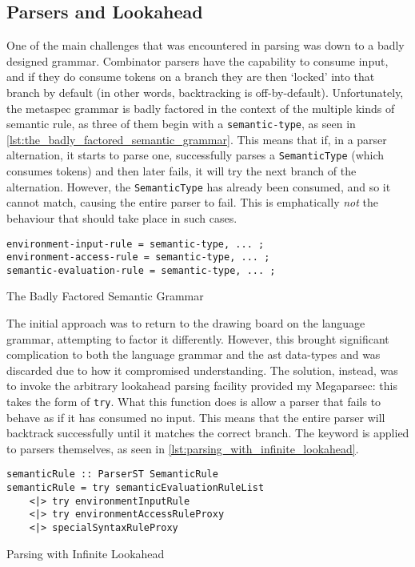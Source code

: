 \subsection{Parsers and Lookahead} %
\label{sub:parsers_and_lookahead}
One of the main challenges that was encountered in parsing was down to a badly designed grammar. 
Combinator parsers have the capability to consume input, and if they do consume tokens on a branch they are then `locked' into that branch by default (in other words, backtracking is off-by-default).
Unfortunately, the \gls{metaspec} grammar is badly factored in the context of the multiple kinds of semantic rule, as three of them begin with a \texttt{semantic-type}, as seen in \autoref{lst:the_badly_factored_semantic_grammar}.
This means that if, in a parser alternation, it starts to parse one, successfully parses a \texttt{SemanticType} (which consumes tokens) and then later fails, it will try the next branch of the alternation.
However, the \texttt{SemanticType} has already been consumed, and so it cannot match, causing the entire parser to fail. 
This is emphatically \textit{not} the behaviour that should take place in such cases. 

\begin{listing}[!htb]
\begin{verbatim}
environment-input-rule = semantic-type, ... ;
environment-access-rule = semantic-type, ... ;
semantic-evaluation-rule = semantic-type, ... ;
\end{verbatim}
\caption{The Badly Factored Semantic Grammar}
\label{lst:the_badly_factored_semantic_grammar}
\end{listing}

The initial approach was to return to the drawing board on the language grammar, attempting to factor it differently. 
However, this brought significant complication to both the language grammar and the \gls{ast} data-types and was discarded due to how it compromised understanding. 
The solution, instead, was to invoke the arbitrary lookahead parsing facility provided my Megaparsec: this takes the form of \texttt{try}. 
What this function does is allow a parser that fails to behave as if it has consumed no input. 
This means that the entire parser will backtrack successfully until it matches the correct branch.
The keyword is applied to parsers themselves, as seen in \autoref{lst:parsing_with_infinite_lookahead}.

\begin{listing}[!htb]
\begin{verbatim}
semanticRule :: ParserST SemanticRule
semanticRule = try semanticEvaluationRuleList
    <|> try environmentInputRule
    <|> try environmentAccessRuleProxy
    <|> specialSyntaxRuleProxy
\end{verbatim}
\caption{Parsing with Infinite Lookahead}
\label{lst:parsing_with_infinite_lookahead}
\end{listing}

